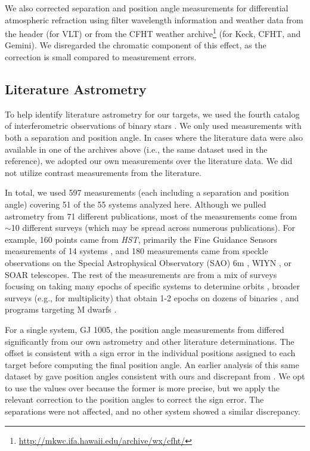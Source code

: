 \documentclass[twocolumn]{aastex62}
\begin{document}
We also corrected separation and position angle measurements for differential atmospheric refraction \citep[DAR, ][]{2010SPIE.7736E..1IL} using filter wavelength information and weather data from the header (for VLT) or from the CFHT weather archive\footnote{\href{http://mkwc.ifa.hawaii.edu/archive/wx/cfht/}{http://mkwc.ifa.hawaii.edu/archive/wx/cfht/}} (for Keck, CFHT, and Gemini). We disregarded the chromatic component of this effect, as the correction is small compared to measurement errors. 


\subsection{Literature Astrometry}\label{sec:litas}

To help identify literature astrometry for our targets, we used the fourth catalog of interferometric observations of binary stars \citep[INT4,][]{Hartkopf:2001}. We only used measurements with both a separation and position angle. In cases where the literature data were also available in one of the archives above (i.e., the same dataset used in the reference), we adopted our own measurements over the literature data. We did not utilize contrast measurements from the literature.

In total, we used 597 measurements (each including a separation and position angle) covering 51 of the 55 systems analyzed here. Although we pulled astrometry from 71 different publications, most of the measurements come from $\sim$10 different surveys (which may be spread across numerous publications). For example, 160 points came from {\it HST}, primarily the Fine Guidance Sensors measurements of 14 systems \citep[e.g.,][]{Benedict2016}, and 180 measurements came from speckle observations on the Special Astrophysical Observatory (SAO) 6m \citep[e.g.,][]{Bag2002}, WIYN \citep[e.g.,][]{Hor2017}, or SOAR \citep[e.g.,][]{Tok2017} telescopes. The rest of the measurements are from a mix of surveys focusing on taking many epochs of specific systems to determine orbits \citep[e.g.,][]{Koh2012}, broader surveys (e.g., for multiplicity) that obtain 1-2 epochs on dozens of binaries \citep[e.g.,][]{Jnn2012}, and programs targeting M dwarfs \citep[e.g.,][]{Mason2018}.

For a single system, GJ 1005, the position angle measurements from \citet{Benedict2016} differed significantly from our own astrometry and other literature determinations. The offset is consistent with a sign error in the individual positions assigned to each target before computing the final position angle. An earlier analysis of this same dataset by \citet{1998AJ....116.1440H} gave position angles consistent with ours and discrepant from \citet{Benedict2016}. We opt to use the \citet{Benedict2016} values over \citet{1998AJ....116.1440H} because the former is more precise, but we apply the relevant correction to the \citet{Benedict2016} position angles to correct the sign error. The separations were not affected, and no other system showed a similar discrepancy. 
\end{document}
